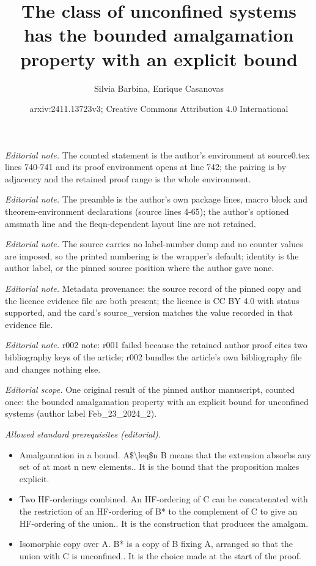 \documentclass[10pt,a4paper]{article}
\title{The class of unconfined systems has the bounded amalgamation property with an explicit bound}
\author{Silvia Barbina, Enrique Casanovas}
\date{arxiv:2411.13723v3; Creative Commons Attribution 4.0 International}
\theoremstyle{note}
\begin{document}
\maketitle
\noindent\textit{Editorial note.} The counted statement is the author's environment at source0.tex lines 740-741 and its proof environment opens at line 742; the pairing is by adjacency and the retained proof range is the whole environment.\par\medskip
\noindent\textit{Editorial note.} The preamble is the author's own package lines, macro block and theorem-environment declarations (source lines 4-65); the author's optioned amsmath line and the fleqn-dependent layout line are not retained.\par\medskip
\noindent\textit{Editorial note.} The source carries no label-number dump and no counter values are imposed, so the printed numbering is the wrapper's default; identity is the author label, or the pinned source position where the author gave none.\par\medskip
\noindent\textit{Editorial note.} Metadata provenance: the source record of the pinned copy and the licence evidence file are both present; the licence is CC BY 4.0 with status supported, and the card's source\_version matches the value recorded in that evidence file.\par\medskip
\noindent\textit{Editorial note.} r002 note: r001 failed because the retained author proof cites two bibliography keys of the article; r002 bundles the article's own bibliography file and changes nothing else.\par\medskip
\noindent\textit{Editorial scope.} One original result of the pinned author manuscript, counted once: the bounded amalgamation property with an explicit bound for unconfined systems (author label Feb\_23\_2024\_2).\par\medskip
\noindent\textit{Allowed standard prerequisites (editorial).}\begin{itemize}
\item Amalgamation in a bound. A\$\textbackslash{}leq\$n B means that the extension absorbs any set of at most n new elements.. It is the bound that the proposition makes explicit.
\item Two HF-orderings combined. An HF-ordering of C can be concatenated with the restriction of an HF-ordering of B* to the complement of C to give an HF-ordering of the union.. It is the construction that produces the amalgam.
\item Isomorphic copy over A. B* is a copy of B fixing A, arranged so that the union with C is unconfined.. It is the choice made at the start of the proof.
\end{itemize}\medskip
\end{document}
